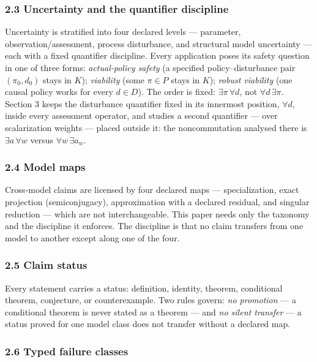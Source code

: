 \documentclass[11pt]{article}
\begin{document}
\subsubsection{2.3 Uncertainty and the quantifier
discipline}\label{uncertainty-and-the-quantifier-discipline}

Uncertainty is stratified into four declared levels --- parameter,
observation/assessment, process disturbance, and structural model
uncertainty --- each with a fixed quantifier discipline. Every
application poses its safety question in one of three forms:
\emph{actual-policy safety} (a specified policy--disturbance pair
\((\pi_0, d_0)\) stays in \(K\)); \emph{viability} (some \(\pi \in P\)
stays in \(K\)); \emph{robust viability} (one causal policy works for
every \(d \in D\)). The order is fixed: \(\exists \pi\, \forall d\), not
\(\forall d\, \exists \pi\). Section 3 keeps the disturbance quantifier
fixed in its innermost position, \(\forall d\), inside every assessment
operator, and studies a second quantifier --- over scalarization weights
--- placed outside it: the noncommutation analysed there is
\(\exists a\, \forall w\) versus \(\forall w\, \exists a_w\).

\subsubsection{2.4 Model maps}\label{model-maps}

Cross-model claims are licensed by four declared maps ---
specialization, exact projection (semiconjugacy), approximation with a
declared residual, and singular reduction --- which are not
interchangeable. This paper needs only the taxonomy and the discipline
it enforces. The discipline is that no claim transfers from one model to
another except along one of the four.

\subsubsection{2.5 Claim status}\label{claim-status}

Every statement carries a status: definition, identity, theorem,
conditional theorem, conjecture, or counterexample. Two rules govern:
\emph{no promotion} --- a conditional theorem is never stated as a
theorem --- and \emph{no silent transfer} --- a status proved for one
model class does not transfer without a declared map.

\subsubsection{2.6 Typed failure classes}\label{typed-failure-classes}
\end{document}
